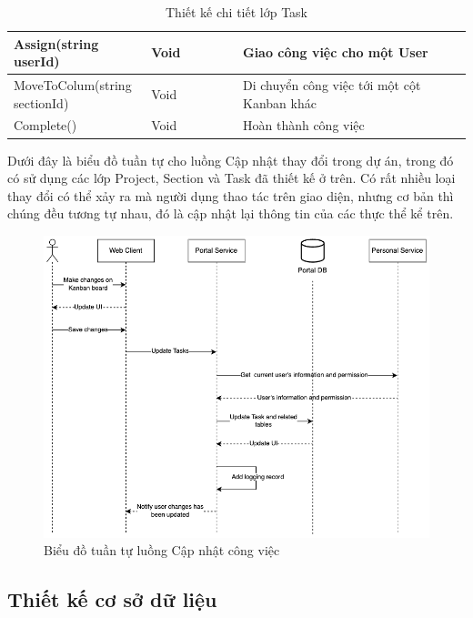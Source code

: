 \documentclass[../DoAn.tex]{subfiles}
\begin{document}
\begin{table}[H]
\begin{tabular}{p{0.3\linewidth}p{0.2\linewidth}p{0.5\linewidth}}
        Assign(string userId)         & Void                  & Giao công việc cho một User                     \\ \hline
        MoveToColum(string sectionId) & Void                  & Di chuyển công việc tới một cột Kanban khác     \\ \hline
        Complete()                    & Void                  & Hoàn thành công việc                            \\ \hline
    \end{tabular}
    \renewcommand{\arraystretch}{1}
    \caption{Thiết kế chi tiết lớp Task}
    \label{fig:classdesign_task}
\end{table}

\newpage

Dưới đây là biểu đồ tuần tự cho luồng Cập nhật thay đổi trong dự án, trong đó có sử dụng các lớp Project, Section và Task đã thiết kế ở trên.
Có rất nhiều loại thay đổi có thể xảy ra mà người dụng thao tác trên giao diện, nhưng cơ bản thì chúng đều tương tự nhau, đó là cập nhật lại thông tin
của các thực thể kể trên.


\begin{figure}[H]
    \centering
    \includegraphics[width=1.0\linewidth]{Hinhve/SequenceDiagram_UpdateTask.png}
    \caption{Biểu đồ tuần tự luồng Cập nhật công việc}
    \label{fig:SequenceDiagram_Register}
\end{figure}

\newpage

\subsection{Thiết kế cơ sở dữ liệu}
\label{subsection:4.2.3}
\end{document}
